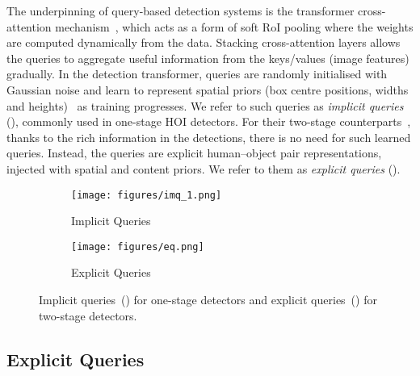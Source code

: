 \documentclass[10pt,twocolumn,letterpaper]{article}
\begin{document}
The underpinning of query-based detection systems is the transformer cross-attention mechanism~\cite{xfmer}, which acts as a form of soft RoI pooling where the weights are computed dynamically from the data. Stacking cross-attention layers allows the queries to aggregate useful information from the keys/values (image features) gradually. In the detection transformer, queries are randomly initialised with Gaussian noise and learn to represent spatial priors (box centre positions, widths and heights)~\cite{detr} as training progresses. We refer to such queries as \textit{implicit queries} (), commonly used in one-stage HOI detectors. For their two-stage counterparts~\cite{upt, stip}, thanks to the rich information in the detections, there is no need for such learned queries. Instead, the queries are explicit human--object pair representations, injected with spatial and content priors. We refer to them as \textit{explicit queries} ().

\begin{figure}[t]\captionsetup[subfigure]{font=footnotesize}
   \begin{subfigure}[t]{0.48\linewidth}
     \centering
     \texttt{[image: figures/imq\_1.png]}
     \caption{Implicit Queries}
     \label{fig:imp_q}
   \end{subfigure}
   \begin{subfigure}[t]{0.48\linewidth}
   \centering
     \texttt{[image: figures/eq.png]}
     \caption{Explicit Queries}
     \label{fig:exp_q}
   \end{subfigure}
   \vspace{5px}
   \caption{Implicit queries~() for one-stage detectors and explicit queries~() for two-stage detectors.}
   \label{fig:decoder}
\end{figure}

\subsection{Explicit Queries}
\end{document}
